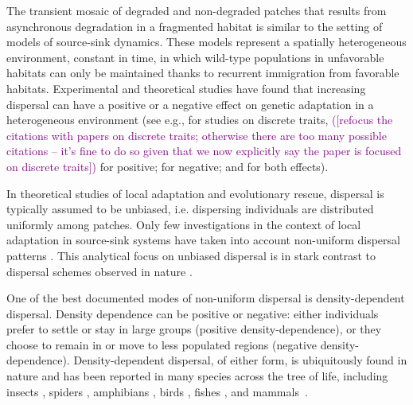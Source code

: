 \documentclass[11pt]{article}
\newcommand{\florence}[1]{\textcolor{purple}{(#1)}} %
\newcommand{\chg}[1]{\textcolor{change}{#1}}
\begin{document}
The transient mosaic of degraded and non-degraded patches that results from asynchronous degradation in a fragmented habitat is similar to the setting of models of source-sink dynamics. These models represent a spatially heterogeneous environment, constant in time, in which wild-type populations in unfavorable habitats can only be maintained thanks to recurrent immigration from favorable habitats. 
Experimental and theoretical studies have found that \chg{increasing} dispersal can have a positive or a negative effect on genetic adaptation in a heterogeneous environment (see e.g., for studies on discrete traits, \florence{[refocus the citations with papers on discrete traits; otherwise there are too many possible citations -- it's fine to do so given that we now explicitly say the paper is focused on discrete traits]}\citet{holt_1997,gomulkiewicz_1999} for positive; \citet{storfer_1998,garcia_1997,kirkpatrick_1997,fedorka_2012} for negative; and \chg{\citet{kawecki_2000, gallet_2018}} for both effects).

In theoretical studies of local adaptation and evolutionary rescue, dispersal is typically assumed to be \chg{unbiased}, i.e. dispersing individuals are distributed uniformly among patches. Only few investigations in the context of local adaptation in source-sink systems have taken into account non-\chg{uniform} dispersal patterns \citep[e.g.][]{kawecki_1995,holt_1996,kawecki_2002,amarasekare_2004}. This analytical focus on \chg{unbiased} dispersal is in stark contrast to dispersal schemes observed in nature \citep[][]{edelaar_2008,clobert_2009,edelaar_2012}. 

One of the best documented modes of non-\chg{uniform} dispersal is density-dependent dispersal. Density dependence can be positive or negative: either individuals prefer to settle or stay in large groups (positive density-dependence), or they choose to remain in or move to less populated regions (negative density-dependence). Density-dependent dispersal, of either form, is ubiquitously found in nature and has been reported in many species across the tree of life, including insects \citep{endriss_2019}, spiders \citep{meester2010}, amphibians \citep{gautier_2006}, birds \citep{wilson_2017}, fishes \citep{turgeon_2012}, and mammals~\citep{stoen_2006}.
\end{document}
